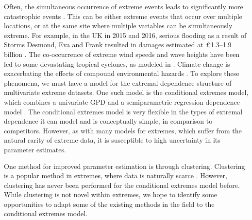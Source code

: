 \documentclass{article}
\numberwithin{equation}{section}
\begin{document}
Often, the simultaneous occurrence of extreme events leads to significantly more catastrophic events \citep{zscheischler2018future, bevacqua2021guidelines}.
This can be either extreme events that occur over multiple locations, or at the same site where multiple variables can be simultaneously extreme.
For example, in the UK in 2015 and 2016, serious flooding as a result of Storms Desmond, Eva and Frank resulted in damages estimated at £1.3–1.9 billion \citep{FloodsWinter, Rohrbeck2021}.
The co-occurrence of extreme wind speeds and wave heights have been led to some devastating tropical cyclones, as modeled in \citet{Sando2022}.
Climate change is exacerbating the effects of compound environmental hazards \citet{AghaKouchak2020-ji}.
To explore these phenomena, we must have a model for the extremal dependence structure of multivariate extreme datasets.
One such model is the conditional extremes model, which combines a univariate GPD and a semiparametric regression dependence model \cite{Heffernan2004}.
The conditional extremes model is very flexible in the types of extremal dependence it can model and is conceptually simple, in comparison to competitors.
However, as with many models for extremes, which suffer from the natural rarity of extreme data, it is susceptible to high uncertainty in its parameter estimates. 

One method for improved parameter estimation is through clustering.
Clustering is a popular method in extremes, where data is naturally scarce \citep{Ferreira2023-mz, Zheng2023-jf}.
However, clustering has never been performed for the conditional extremes model before. 
While clustering is not novel within extremes, we hope to identify some opportunities to adapt some of the existing methods in the field to the conditional extremes model.
\end{document}
